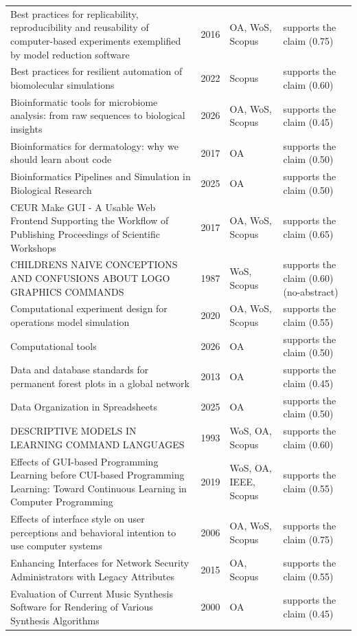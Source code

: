 \begin{longtable}{@{}%
  >{\raggedright\arraybackslash}p{}c%
  >{\raggedright\arraybackslash}p{}%
  >{\raggedright\arraybackslash}p{}@{}}
Best practices for replicability, reproducibility and reusability of computer-based experiments exemplified by model reduction software & 2016 & OA, WoS, Scopus & supports the claim (0.75) \\
Best practices for resilient automation of biomolecular simulations & 2022 & Scopus & supports the claim (0.60) \\
Bioinformatic tools for microbiome analysis: from raw sequences to biological insights & 2026 & OA, WoS, Scopus & supports the claim (0.45) \\
Bioinformatics for dermatology: why we should learn about code & 2017 & OA & supports the claim (0.50) \\
Bioinformatics Pipelines and Simulation in Biological Research & 2025 & OA & supports the claim (0.50) \\
CEUR Make GUI - A Usable Web Frontend Supporting the Workflow of Publishing Proceedings of Scientific Workshops & 2017 & OA, WoS, Scopus & supports the claim (0.65) \\
CHILDRENS NAIVE CONCEPTIONS AND CONFUSIONS ABOUT LOGO GRAPHICS COMMANDS & 1987 & WoS, Scopus & supports the claim (0.60) (no-abstract) \\
Computational experiment design for operations model simulation & 2020 & OA, WoS, Scopus & supports the claim (0.55) \\
Computational tools & 2026 & OA & supports the claim (0.50) \\
Data and database standards for permanent forest plots in a global network & 2013 & OA & supports the claim (0.45) \\
Data Organization in Spreadsheets & 2025 & OA & supports the claim (0.50) \\
DESCRIPTIVE MODELS IN LEARNING COMMAND LANGUAGES & 1993 & WoS, OA, Scopus & supports the claim (0.60) \\
Effects of GUI-based Programming Learning before CUI-based Programming Learning: Toward Continuous Learning in Computer Programming & 2019 & WoS, OA, IEEE, Scopus & supports the claim (0.55) \\
Effects of interface style on user perceptions and behavioral intention to use computer systems & 2006 & OA, WoS, Scopus & supports the claim (0.75) \\
Enhancing Interfaces for Network Security Administrators with Legacy Attributes & 2015 & OA, Scopus & supports the claim (0.55) \\
Evaluation of Current Music Synthesis Software for Rendering of Various Synthesis Algorithms & 2000 & OA & supports the claim (0.45) \\

\end{longtable}
